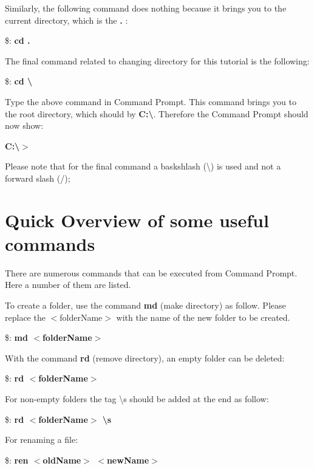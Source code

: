 \documentclass{article}
\begin{document}
	\par Similarly, the following command does nothing because it brings you to the current directory, which is the \textbf{.} :
	\par \$: \textbf{cd .}
	
	\par The final command related to changing directory for this tutorial is the following: 
	
	\par \$: \textbf{cd \textbackslash}
		
		\par Type the above command in Command Prompt. This command brings you to the root directory, which should by \textbf{C:\textbackslash}. Therefore the Command Prompt should now show:
		\par \textbf{C:\textbackslash $>$}
		\par Please note that for the final command a baskshlash (\textbackslash) is used and not a forward slash (/);
	

	\section{Quick Overview of some useful commands}\label{sec:Commands}
	
	\par There are numerous commands that can be executed from Command Prompt. Here a number of them are listed.
	
	\par To create a folder, use the command \textbf{md} (make directory) as follow. Please replace the $<$folderName$>$ with the name of the new folder to be created. 
	
	\par \$:\textbf{ md $<$folderName$>$}
	
	With the command \textbf{rd} (remove directory), an empty folder can be deleted:
	
	\par \$: \textbf{rd $<$folderName$>$}
	
	For non-empty folders the tag \textbackslash s should be added at the end as follow:
	
	\par \$: \textbf{rd $<$folderName$>$ \textbackslash s} 
	
	\par For renaming a file:
	
	\$: \textbf{ren $<$oldName$>$ $<$newName$>$}
	
\end{document}
